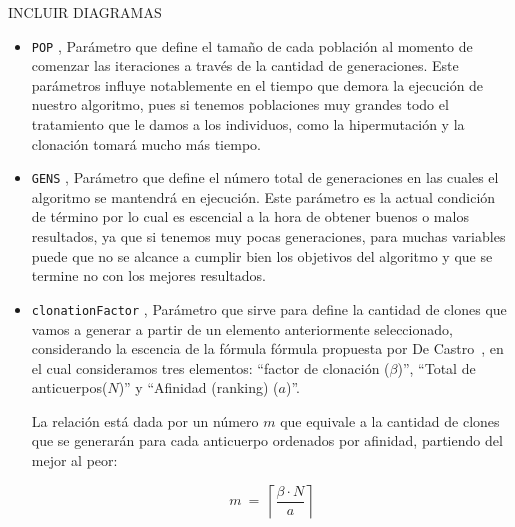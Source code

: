 %

 INCLUIR DIAGRAMAS

\begin{itemize}
	\item \texttt{POP} , Parámetro que define el tamaño de cada población al momento de comenzar
			las iteraciones a través de la cantidad de generaciones.
			Este parámetros influye notablemente en el tiempo que demora la ejecución de nuestro algoritmo,
			pues si tenemos poblaciones muy grandes todo el tratamiento que le damos a los individuos,
			como la hipermutación y la clonación tomará mucho más tiempo.

	\item \texttt{GENS} , Parámetro que define el número total de generaciones en las cuales
			el algoritmo se mantendrá en ejecución. Este parámetro es la actual condición de término
			por lo cual es escencial a la hora de obtener buenos o malos resultados, ya que si tenemos
			muy pocas generaciones, para muchas variables puede que no se alcance a cumplir bien los
			objetivos del algoritmo y que se termine no con los mejores resultados.

	\item \texttt{clonationFactor} \blue{[0,1]} \red{$(\beta)$}, Parámetro que sirve para define la cantidad de clones
			que vamos a generar a partir de un elemento anteriormente seleccionado, considerando la escencia de la
			fórmula fórmula propuesta por De Castro~\cite{decastro}, en el cual consideramos tres elementos:
			``factor de clonación ($\beta$)'', ``Total de anticuerpos($N$)'' y ``Afinidad (ranking) ($a$)''.
			
			La relación está dada por un número $m$ que equivale a la cantidad de clones que se generarán
            para cada anticuerpo ordenados por afinidad, partiendo del mejor al peor:

            $$m\ =\ \left\lceil\frac{\beta \cdot N}{a}\right\rceil$$


\end{itemize}

